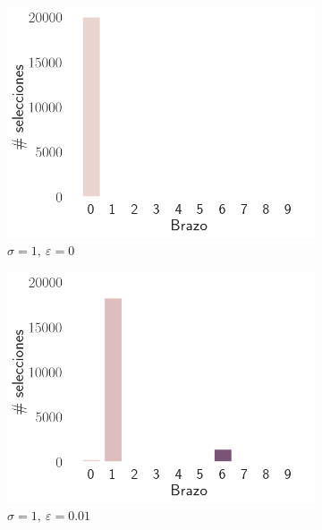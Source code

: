 \documentclass[12pt]{article}
\begin{document}
\begin{figure}[H]
        \begin{subfigure}[H]{0.3\textwidth}
            \includegraphics[width=\textwidth]{../img/arm_sigma_1_epsilon_0}
            \caption{$\sigma=1 ,\ \varepsilon=0$}
            \label{fig:arms_selected_1_0}
        \end{subfigure}
        \begin{subfigure}[H]{0.3\textwidth}
            \includegraphics[width=\textwidth]{../img/arm_sigma_1_epsilon_0.01}
            \caption{$\sigma=1 ,\ \varepsilon=0.01$}
            \label{fig:arms_selected_1_0.01}
        \end{subfigure}
        \begin{subfigure}[H]{0.3\textwidth}

\end{subfigure}
\end{figure}
\end{document}
